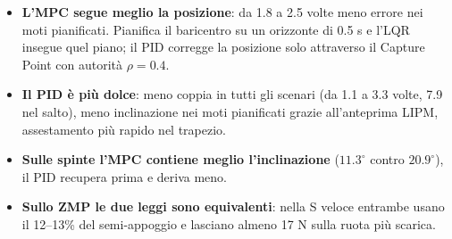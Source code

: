 \documentclass[11pt,a4paper]{article}
\begin{document}
\begin{table}[h!]
\centering
\small
\renewcommand{\arraystretch}{1.25}
\caption{Metriche chiave in cui una delle due leggi è migliore (PID vs MPC).}
\end{table}

\begin{tcolorbox}[title=Lettura dei risultati]
\begin{itemize}
    \item \textbf{L'MPC segue meglio la posizione}: da 1.8 a 2.5 volte meno errore nei moti pianificati. Pianifica il baricentro su un orizzonte di 0.5 s e l'LQR insegue quel piano; il PID corregge la posizione solo attraverso il Capture Point con autorità $\rho = 0.4$.
    \item \textbf{Il PID è più dolce}: meno coppia in tutti gli scenari (da 1.1 a 3.3 volte, 7.9 nel salto), meno inclinazione nei moti pianificati grazie all'anteprima LIPM, assestamento più rapido nel trapezio.
    \item \textbf{Sulle spinte l'MPC contiene meglio l'inclinazione} ($11.3^\circ$ contro $20.9^\circ$), il PID recupera prima e deriva meno.
    \item \textbf{Sullo ZMP le due leggi sono equivalenti}: nella S veloce entrambe usano il 12--13\% del semi-appoggio e lasciano almeno 17 N sulla ruota più scarica.
\end{itemize}
\end{tcolorbox}
\end{document}
